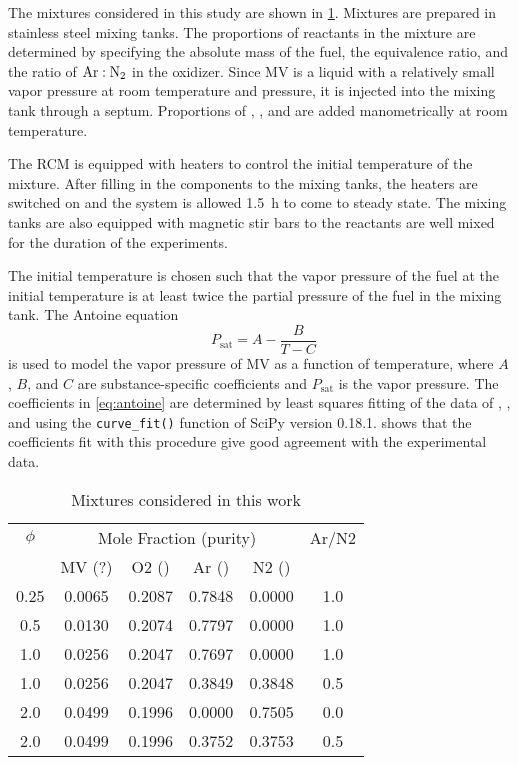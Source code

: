 \documentclass[12pt]{../ussci}
\newcommand*{\logten}{\mathop{\log_{10}}}
\begin{document}
The mixtures considered in this study are shown in \cref{tab:mixtures}. Mixtures
are prepared in stainless steel mixing tanks. The proportions of reactants in
the mixture are determined by specifying the absolute mass of the fuel, the
equivalence ratio, and the ratio of \(\ce{Ar}:\ce{N2}\) in the oxidizer. Since
MV is a liquid with a relatively small vapor pressure at room temperature and
pressure, it is injected into the mixing tank through a septum. Proportions of
, , and  are added manometrically at room temperature.

The RCM is equipped with heaters to control the initial temperature of the
mixture. After filling in the components to the mixing tanks, the heaters are
switched on and the system is allowed \SI{1.5}{\hour} to come to steady state.
The mixing tanks are also equipped with magnetic stir bars to the reactants are
well mixed for the duration of the experiments.

The initial temperature is chosen such that the vapor pressure of the fuel at
the initial temperature is at least twice the partial pressure of the fuel in
the mixing tank. The Antoine equation
%
\begin{equation}\label{eq:antoine}
    \logten{P_{\text{sat}}} = A - \frac{B}{T - C}
\end{equation}
%
is used to model the vapor pressure of MV as a function of temperature, where
\(A\), \(B\), and \(C\) are substance-specific coefficients and
\(P_{\text{sat}}\) is the vapor pressure. The coefficients in \cref{eq:antoine}
are determined by least squares fitting of the data of \textcite{Ortega2003},
\textcite{vanGenderen2002}, and \textcite{Verevkin2008} using the
\verb|curve_fit()| function of SciPy \autocite{Jones2001} version 0.18.1.
 shows that the coefficients fit with this procedure
give good agreement with the experimental data.

\begin{table}[htb]
    \centering
    \caption{Mixtures considered in this work}
    \begin{tabular}{cccccc}
        \toprule
        \(\phi\) & \multicolumn{4}{c}{Mole Fraction (purity)} & Ar/N2 \\
        \cmidrule{2-5}
         & MV (?) & O2 () & Ar () & N2 () &  \\
        0.25 & 0.0065 & 0.2087 & 0.7848 & 0.0000 & 1.0 \\
        0.5 & 0.0130 & 0.2074 & 0.7797 & 0.0000 & 1.0 \\
        1.0 & 0.0256 & 0.2047 & 0.7697 & 0.0000 & 1.0 \\
        1.0 & 0.0256 & 0.2047 & 0.3849 & 0.3848 & 0.5 \\
        2.0 & 0.0499 & 0.1996 & 0.0000 & 0.7505 & 0.0 \\
        2.0 & 0.0499 & 0.1996 & 0.3752 & 0.3753 & 0.5 \\
        \bottomrule
    \end{tabular}
    \label{tab:mixtures}
\end{table}
\end{document}
